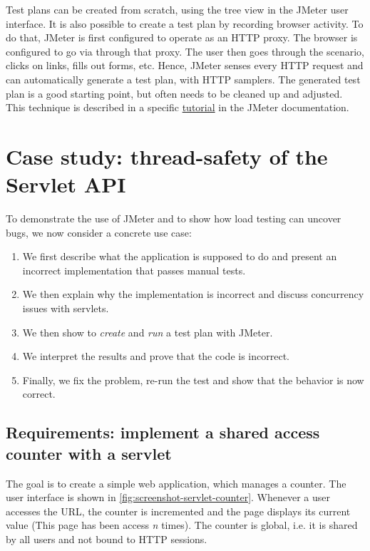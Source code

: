 Test plans can be created from scratch, using the tree view in the JMeter user interface. It is also possible to create a test plan by recording browser activity. To do that, JMeter is first configured to operate as an HTTP proxy. The browser is configured to go via through that proxy. The user then goes through the scenario, clicks on links, fills out forms, etc. Hence, JMeter senses every HTTP request and can automatically generate a test plan, with HTTP samplers. The generated test plan is a good starting point, but often needs to be cleaned up and adjusted. This technique is described in a specific \href{https://jmeter.apache.org/usermanual/jmeter_proxy_step_by_step.html}{tutorial} in the JMeter documentation.

\section{Case study: thread-safety of the Servlet API}
\label{section:thread-safety-servlets-jmeter}

To demonstrate the use of JMeter and to show how load testing can uncover bugs, we now consider a concrete use case:

\begin{enumerate}
\item We first describe what the application is supposed to do and present an incorrect implementation that passes manual tests.
\item We then explain why the implementation is incorrect and discuss concurrency issues with servlets.
\item We then show to \emph{create} and \emph{run} a test plan with JMeter.
\item We interpret the results and prove that the code is incorrect.
\item Finally, we fix the problem, re-run the test and show that the behavior is now correct.
\end{enumerate}

\subsection{Requirements: implement a shared access counter with a servlet}

The goal is to create a simple web application, which manages a counter. The user interface is shown in \ref{fig:screenshot-servlet-counter}. Whenever a user accesses the URL, the counter is incremented and the page displays its current value (This page has been access \emph{n} times). The counter is global, i.e. it is shared by all users and not bound to HTTP sessions.

